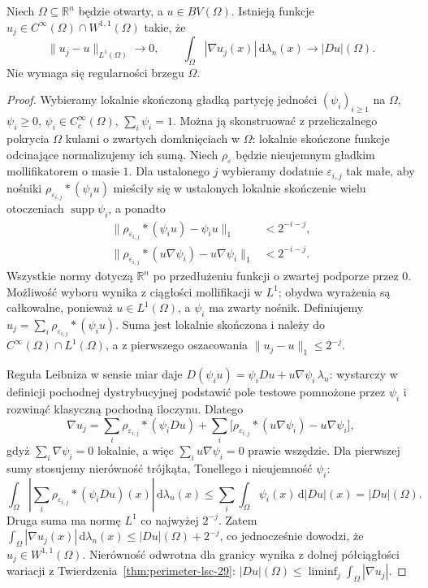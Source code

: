 \begin{lemat}
\label{lem:BV-strict-approx}
Niech $\Omega\subseteq\mathbb R^n$ będzie otwarty,
a $u\in BV(\Omega)$. Istnieją funkcje
$u_j\in C^\infty(\Omega)\cap W^{1,1}(\Omega)$ takie, że
\[
 \|u_j-u\|_{L^1(\Omega)}\longrightarrow0,
 \qquad
 \int_\Omega|\nabla u_j(x)|\,\mathrm d\lambda_n(x)
 \longrightarrow |Du|(\Omega).
\]
Nie wymaga się regularności brzegu $\Omega$.
\end{lemat}
\begin{proof}
Wybieramy lokalnie skończoną gładką partycję
jedności $(\psi_i)_{i\ge1}$ na $\Omega$,
$\psi_i\ge0$, $\psi_i\in C_c^\infty(\Omega)$,
$\sum_i\psi_i=1$. Można ją skonstruować z
przeliczalnego pokrycia $\Omega$ kulami o zwartych
domknięciach w $\Omega$: lokalnie skończone
funkcje odcinające normalizujemy ich sumą.
Niech $\rho_\varepsilon$ będzie nieujemnym
gładkim mollifikatorem o masie $1$.
Dla ustalonego $j$ wybieramy dodatnie
$\varepsilon_{i,j}$ tak małe, aby nośniki
$\rho_{\varepsilon_{i,j}}*(\psi_i u)$ mieściły
się w ustalonych lokalnie skończenie wielu
otoczeniach $\operatorname{supp}\psi_i$,
a ponadto
\begin{align*}
 \|\rho_{\varepsilon_{i,j}}*(\psi_i u)-\psi_i u\|_1
 &<2^{-i-j},\\
 \|\rho_{\varepsilon_{i,j}}*(u\nabla\psi_i)
              -u\nabla\psi_i\|_1
 &<2^{-i-j}.
\end{align*}
Wszystkie normy dotyczą $\mathbb R^n$ po
przedłużeniu funkcji o zwartej podporze przez $0$.
Możliwość wyboru wynika z ciągłości mollifikacji
w $L^1$; obydwa wyrażenia są całkowalne, ponieważ
$u\in L^1(\Omega)$, a $\psi_i$ ma zwarty nośnik.
Definiujemy
$u_j=\sum_i\rho_{\varepsilon_{i,j}}*(\psi_i u)$.
Suma jest lokalnie skończona i należy do
$C^\infty(\Omega)\cap L^1(\Omega)$, a z pierwszego
oszacowania
$\|u_j-u\|_1\le2^{-j}$.

Reguła Leibniza w sensie miar daje
$D(\psi_i u)=\psi_i Du+u\nabla\psi_i\,\lambda_n$:
wystarczy w definicji pochodnej dystrybucyjnej
podstawić pole testowe pomnożone przez $\psi_i$
i rozwinąć klasyczną pochodną iloczynu.
Dlatego
\[
 \nabla u_j
 =\sum_i\rho_{\varepsilon_{i,j}}*(\psi_i Du)
 +\sum_i\bigl[\rho_{\varepsilon_{i,j}}*(u\nabla\psi_i)
                  -u\nabla\psi_i\bigr],
\]
gdyż $\sum_i\nabla\psi_i=0$ lokalnie,
a więc $\sum_i u\nabla\psi_i=0$ prawie wszędzie.
Dla pierwszej sumy stosujemy nierówność trójkąta,
Tonellego i nieujemność $\psi_i$:
\[
 \int_\Omega\left|
 \sum_i\rho_{\varepsilon_{i,j}}*(\psi_i Du)(x)
 \right|\,\mathrm d\lambda_n(x)
 \le\sum_i\int_\Omega\psi_i(x)\,\mathrm d|Du|(x)
 =|Du|(\Omega).
\]
Druga suma ma normę $L^1$ co najwyżej $2^{-j}$.
Zatem $\int_\Omega|\nabla u_j(x)|\,\mathrm d\lambda_n(x)
\le|Du|(\Omega)+2^{-j}$, co jednocześnie dowodzi,
że $u_j\in W^{1,1}(\Omega)$.
Nierówność odwrotna dla granicy wynika z
dolnej półciągłości wariacji z
Twierdzenia~\ref{thm:perimeter-lsc-29}:
$|Du|(\Omega)\le\liminf_j\int_\Omega|\nabla u_j|$.
\end{proof}


